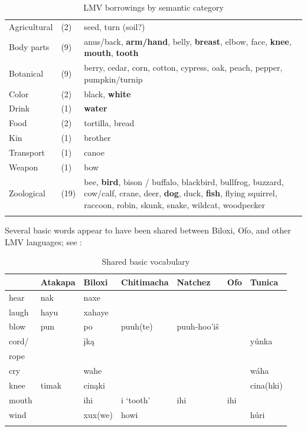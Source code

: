 \documentclass[output=paper]{LSP/langsci}
\begin{document}
\begin{table}
\caption{LMV borrowings by semantic category} \label{LMVloans}
\begin{tabularx}{\textwidth}{llX}
\lsptoprule
Agricultural & (2) & seed, turn (soil?) \\
Body parts & (9) & anus/back, \textbf{arm/hand}, belly, \textbf{breast}, elbow, face, \textbf{knee},  \textbf{mouth}, \textbf{tooth}  \\
Botanical & (9) & berry, cedar, corn, cotton, cypress, oak, peach, pepper, pumpkin/turnip  \\ 
Color & (2) & black, \textbf{white} \\
Drink & (1) & \textbf{water} \\
Food & (2) & tortilla, bread \\
Kin & (1) & brother \\
Transport & (1) & canoe \\
Weapon & (1) & bow \\
Zoological & (19) & bee, \textbf{bird}, bison / buffalo, blackbird, bullfrog, buzzard, cow/calf, crane, deer, \textbf{dog}, duck, \textbf{fish}, flying squirrel,   raccoon, robin, skunk, snake, wildcat, woodpecker \\
\lspbottomrule
\end{tabularx}
\end{table}

Several basic words appear to have been shared between Biloxi, Ofo, and other LMV languages; see : 

\begin{table}
\caption{Shared basic vocabulary} \label{sharedvocab}
\begin{tabularx}{\textwidth}{ llllllX }
\lsptoprule 
& Atakapa & Biloxi & Chitimacha & Natchez & Ofo & Tunica\\ 
\midrule
 hear & nak & naxe & & & & \\
laugh & hayu & xahaye & & & &
\\ blow & pun & po & puuh(te) & puuh-hoo’iš & &
\\ cord/ & & įką & & & & yúnka
\\ rope & & & & & &
\\ cry & & wahe & & & & wáha
\\ knee & timak & cinąki & & & & cina(hki)
\\ mouth & & ihi & i  `tooth' & ihi & ihi &
\\ wind & & xux(we) & howi & & & húri 
\\ \lspbottomrule
\end{tabularx}
\end{table}
\end{document}
